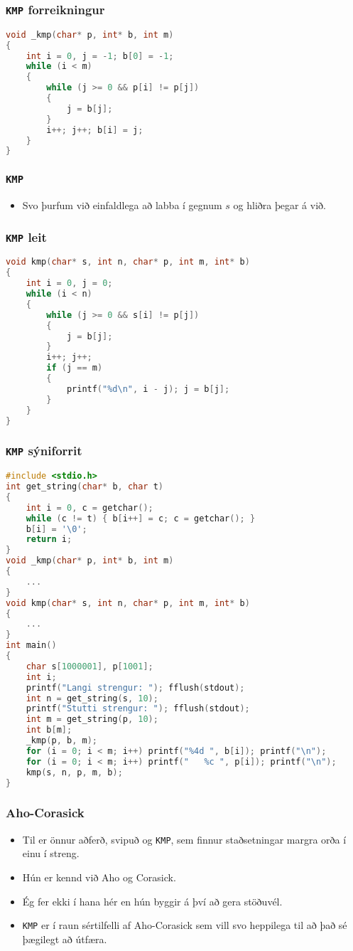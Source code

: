\documentclass{beamer}
\begin{document}
\begin{frame}[fragile]
	\frametitle{\texttt{KMP} forreikningur}
	\tiny
	\begin{lstlisting}[language=C]
void _kmp(char* p, int* b, int m)
{
	int i = 0, j = -1; b[0] = -1;
	while (i < m)
	{
		while (j >= 0 && p[i] != p[j])
		{
			j = b[j];
		}
		i++; j++; b[i] = j;
	}
}
	\end{lstlisting}
\end{frame}

\begin{frame}
	\frametitle{\texttt{KMP}}
	\begin{itemize}
		\item<1-> Svo þurfum við einfaldlega að labba í gegnum $s$ og hliðra þegar á við.
	\end{itemize}
\end{frame}

\begin{frame}[fragile]
	\frametitle{\texttt{KMP} leit}
	\tiny
	\begin{lstlisting}[language=C]
void kmp(char* s, int n, char* p, int m, int* b)
{
	int i = 0, j = 0;
	while (i < n)
	{
		while (j >= 0 && s[i] != p[j])
		{
			j = b[j];
		}
		i++; j++;
		if (j == m)
		{
			printf("%d\n", i - j); j = b[j];
		}
	}
}
	\end{lstlisting}
\end{frame}

\begin{frame}[fragile]
	\frametitle{\texttt{KMP} sýniforrit}
	\tiny
	\begin{lstlisting}[language=C]
#include <stdio.h>
int get_string(char* b, char t)
{
	int i = 0, c = getchar();
	while (c != t) { b[i++] = c; c = getchar(); }
	b[i] = '\0';
	return i;
}
void _kmp(char* p, int* b, int m)
{
	...
}
void kmp(char* s, int n, char* p, int m, int* b)
{
	...
}
int main()
{
	char s[1000001], p[1001];
	int i;
	printf("Langi strengur: "); fflush(stdout);
	int n = get_string(s, 10);
	printf("Stutti strengur: "); fflush(stdout);
	int m = get_string(p, 10);
	int b[m];
	_kmp(p, b, m);
	for (i = 0; i < m; i++) printf("%4d ", b[i]); printf("\n");
	for (i = 0; i < m; i++) printf("   %c ", p[i]); printf("\n");
	kmp(s, n, p, m, b);
}
	\end{lstlisting}
\end{frame}

\begin{frame}
	\frametitle{Aho-Corasick}
	\begin{itemize}
		\item<1-> Til er önnur aðferð, svipuð og \texttt{KMP}, sem finnur staðsetningar margra orða í einu í streng.
		\item<2-> Hún er kennd við Aho og Corasick.
		\item<3-> Ég fer ekki í hana hér en hún byggir á því að gera stöðuvél.
		\item<4-> \texttt{KMP} er í raun sértilfelli af Aho-Corasick sem vill svo heppilega til að það sé þægilegt
			að útfæra.
	\end{itemize}
\end{frame}
\end{document}
